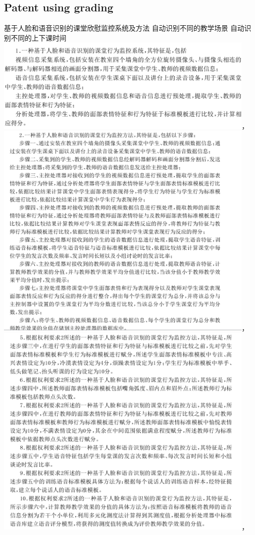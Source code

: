 \documentclass[]{article}
\begin{document}
\begin{CJK}{UTF8}{}
\section{Patent using grading}
基于人脸和语音识别的课堂欣慰监控系统及方法
自动识别不同的教学场景
自动识别不同的上下课时间\\
\includegraphics[width=5in]{pic1}，\\
\includegraphics[width=5in]{pic2}，\\
\includegraphics[width=5in]{pic3}，\\

\end{CJK}
\end{document}
